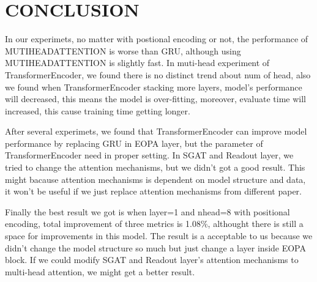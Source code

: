 \documentclass{article}
\begin{document}

\section{CONCLUSION}

In our experimets, no matter with postional encoding or not,
the performance of MUTIHEADATTENTION is worse than GRU,
although using MUTIHEADATTENTION is slightly fast.
In muti-head experiment of TransformerEncoder,
we found there is no distinct trend about num of head,
also we found when TransformerEncoder stacking more layers,
model's performance will decreased, this means the model is over-fitting,
moreover, evaluate time will increased, this cause training time getting longer.

After several experimets, we found that TransformerEncoder can improve
model performance by replacing GRU in EOPA layer,
but the parameter of TransformerEncoder need in proper setting.
In SGAT and Readout layer, we tried to change the attention mechanisms,
but we didn't got a good result.
This might bacause attention mechanisms is dependent on model structure and data,
it won't be useful if we just replace attention mechanisms from different paper.

Finally the best result we got is when layer=1 and nhead=8
with positional encoding, total improvement of three metrics is  1.08\%,
althought there is still a space for improvements in this model.
The result is a acceptable to us because we didn't change the model structure
so much but just change a layer inside EOPA block.
If we could modify SGAT and Readout layer's attention mechanisms
to multi-head attention, we might get a better result.





\end{document}
